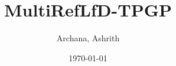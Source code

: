 \title{MultiRefLfD-TPGP}
\author{Archana, Ashrith}
\date{\today}

\makeatletter
\def\maketitle{
    \begin{center}
        {\LARGE \bfseries \@title~\\[1ex]}
        {\large \@author~\\[1ex]}
        {\@date}
    \end{center}
}
\makeatother
\maketitle
